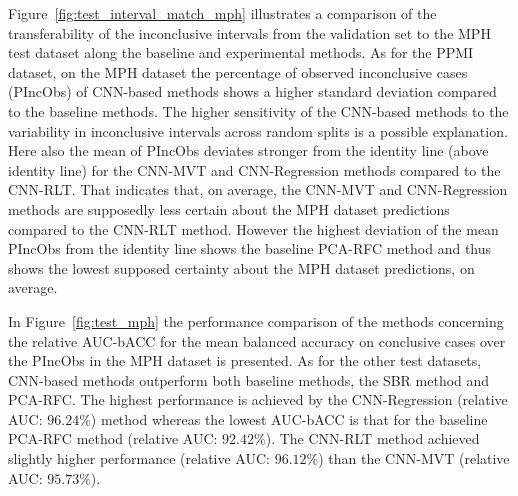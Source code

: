Figure~\ref{fig:test_interval_match_mph} illustrates a comparison of the transferability of the inconclusive intervals 
from the validation set to the MPH test dataset along the baseline and experimental methods.
As for the PPMI dataset, on the MPH dataset the percentage of observed inconclusive cases (PIncObs) of CNN-based methods 
shows a higher standard deviation compared to the baseline methods.
The higher sensitivity of the CNN-based methods 
to the variability in inconclusive intervals across random splits is a possible explanation.
Here also the mean of PIncObs deviates stronger from the identity line (above identity line) 
for the CNN-MVT and CNN-Regression methods compared to the CNN-RLT.
That indicates that, on average, the CNN-MVT and CNN-Regression methods are supposedly less certain 
about the MPH dataset predictions compared to the CNN-RLT method.
However the highest deviation of the mean PIncObs from the identity line shows the baseline PCA-RFC method 
and thus shows the lowest supposed certainty about the MPH dataset predictions, on average.

In Figure~\ref{fig:test_mph} the performance comparison of the methods 
concerning the relative AUC-bACC for the mean balanced accuracy on conclusive cases over the PIncObs 
in the MPH dataset is presented.
As for the other test datasets, CNN-based methods outperform both baseline methods, the SBR method and PCA-RFC.
The highest performance is achieved by the CNN-Regression (relative AUC: $96.24\%$) method 
whereas the lowest AUC-bACC is that for the baseline PCA-RFC method (relative AUC: $92.42\%$).
The CNN-RLT method achieved slightly higher performance (relative AUC: $96.12\%$) 
than the CNN-MVT (relative AUC: $95.73\%$).



